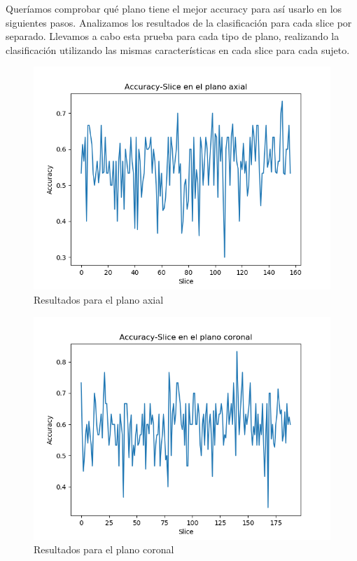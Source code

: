 Queríamos comprobar qué plano tiene el mejor accuracy para así usarlo en los siguientes pasos. Analizamos los resultados de la clasificación para cada slice por separado. Llevamos a cabo esta prueba para cada tipo de plano, realizando la clasificación utilizando las mismas características en cada slice para cada sujeto.

\begin{figure}[H] %
	\centering
	\includegraphics[scale=0.75]{exp1-axial.png}  %
	\caption{Resultados para el plano axial} 
	\label{fig:exp1-axial}
\end{figure}

\begin{figure}[H] %
	\centering
	\includegraphics[scale=0.75]{exp1-cor.png}  %
	\caption{Resultados para el plano coronal} 
	\label{fig:exp1-cor}
\end{figure}

